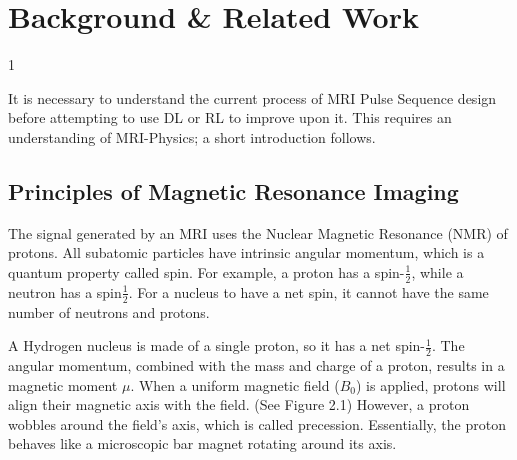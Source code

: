 \doublespacing %

\chapter{Background \& Related Work}
\label{ch2}

\begin{spacing}{1} %
\minitoc %
\end{spacing} %
\thesisspacing %

It is necessary to understand the current process of MRI Pulse Sequence design before attempting to use DL or RL to improve upon it. This requires an understanding of MRI-Physics; a short introduction follows.

\section{Principles of Magnetic Resonance Imaging}

 The signal generated by an MRI uses the Nuclear Magnetic Resonance (NMR) of protons. All subatomic particles have intrinsic angular momentum, which is a quantum property called spin. For example, a proton has a spin-$\frac{1}{2}$, while a neutron has a spin$\frac{1}{2}$. For a nucleus to have a net spin, it cannot have the same number of neutrons and protons. 

 A Hydrogen nucleus is made of a single proton, so it has a net spin-$\frac{1}{2}$. The angular momentum, combined with the mass and charge of a proton, results in a magnetic moment $\mu$. When a uniform magnetic field ($B_0$) is applied, protons will align their magnetic axis with the field. (See Figure 2.1) However, a proton wobbles around the field's axis, which is called precession. Essentially, the proton behaves like a microscopic bar magnet rotating around its axis.\cite{MRI_Physics_Primer:12}
 
